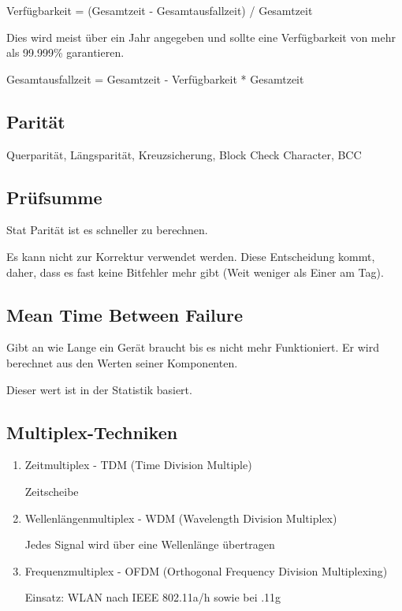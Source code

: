 \documentclass[a4paper]{article}
\begin{document}
Verfügbarkeit = (Gesamtzeit - Gesamtausfallzeit) / Gesamtzeit

Dies wird meist über ein Jahr angegeben und sollte eine Verfügbarkeit von mehr als 99.999\% garantieren.

Gesamtausfallzeit = Gesamtzeit - Verfügbarkeit * Gesamtzeit

\subsection{Parität}

Querparität, Längsparität, Kreuzsicherung, Block Check Character, BCC

\subsection{Prüfsumme}

Stat Parität ist es schneller zu berechnen.

Es kann nicht zur Korrektur verwendet werden. Diese Entscheidung kommt, daher, dass es fast keine Bitfehler mehr gibt (Weit weniger als Einer am Tag).

\subsection{Mean Time Between Failure}

Gibt an wie Lange ein Gerät braucht bis es nicht mehr Funktioniert. Er wird berechnet aus den Werten seiner Komponenten.

Dieser wert ist in der Statistik basiert.



\subsection{Multiplex-Techniken}

\begin{enumerate}
    \item Zeitmultiplex - TDM (Time Division Multiple)
    
    Zeitscheibe
    \item Wellenlängenmultiplex - WDM (Wavelength Division Multiplex)
    
    Jedes Signal wird über eine Wellenlänge übertragen
    \item Frequenzmultiplex - OFDM (Orthogonal Frequency Division Multiplexing)
    
    Einsatz: WLAN nach IEEE 802.11a/h sowie bei .11g
\end{enumerate}
\end{document}
